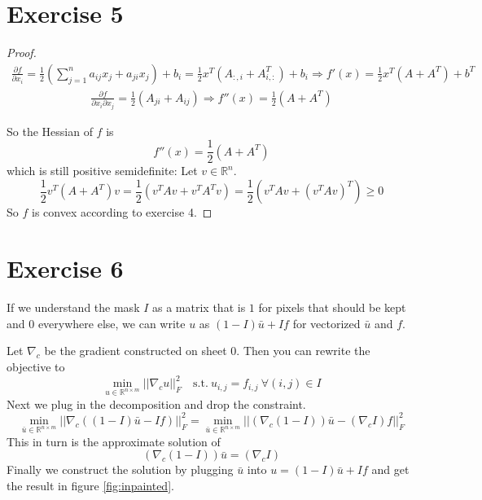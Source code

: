 \documentclass[10pt,a4paper]{article}
\begin{document}
\section*{Exercise 5}

\begin{proof}
  \begin{align*}
    \frac{\partial f}{\partial x_{i}} = \frac{1}{2}\left( \sum_{j = 1}^{n} a_{ij} x_{j} + a_{ji} x_{j} \right) + b_{i} = \frac{1}{2}x^{T}\left( A_{:,i} + A_{i,:}^{T} \right) + b_{i} \Rightarrow f'(x) = \frac{1}{2}x^{T}(A + A^{T}) + b^{T}
  \end{align*}
  \begin{align*}
    \frac{\partial f}{\partial x_{i} \partial x_{j}} = \frac{1}{2} \left( A_{ji} + A_{ij} \right) \Rightarrow f''(x) = \frac{1}{2} \left( A + A^{T} \right)
  \end{align*}

  So the Hessian of $f$ is
  \begin{equation*}
    f''(x) = \frac{1}{2}\left(A + A^{T}\right)
  \end{equation*}
  which is still positive semidefinite:
  Let $v \in \mathbb{R}^{n}$.
  \begin{equation*}
    \frac{1}{2}v^{T}(A + A^{T})v = \frac{1}{2} \left(v^{T}Av + v^{T}A^{T}v\right) = \frac{1}{2} \left(v^{T}Av + (v^{T}Av)^{T}\right) \ge 0
  \end{equation*}
  So $f$ is convex according to exercise 4.
\end{proof}

\section*{Exercise 6}

If we understand the mask $I$ as a matrix that is $1$ for pixels that should be kept and $0$ everywhere else, we can write $u$ as $(1 - I)\bar{u} + If$ for vectorized $\bar{u}$ and $f$.

Let $\nabla_{c}$ be the gradient constructed on sheet 0.
Then you can rewrite the objective to
\begin{equation*}
  \min_{u \in \mathbb{R}^{n \times m}} ||\nabla_{c} u||_{F}^{2} \quad \text{s.t.}~u_{i,j} = f_{i,j}~\forall (i,j) \in I
\end{equation*}
Next we plug in the decomposition and drop the constraint.
\begin{equation*}
  \min_{\bar{u} \in \mathbb{R}^{n \times m}} ||\nabla_{c} \left( (1 - I)\bar{u} - If \right)||_{F}^{2} = \min_{\bar{u} \in \mathbb{R}^{n \times m}} ||\left( \nabla_{c} (1 - I) \right)\bar{u} - \left( \nabla_{c}I \right)f||_{F}^{2}
\end{equation*}
This in turn is the approximate solution of
\begin{equation*}
  \left( \nabla_{c} (1 - I) \right)\bar{u} = \left( \nabla_{c}I \right)
\end{equation*}
Finally we construct the solution by plugging $\bar{u}$ into $u = (1 - I)\bar{u} + If$ and get the result in figure \ref{fig:inpainted}.
\end{document}
